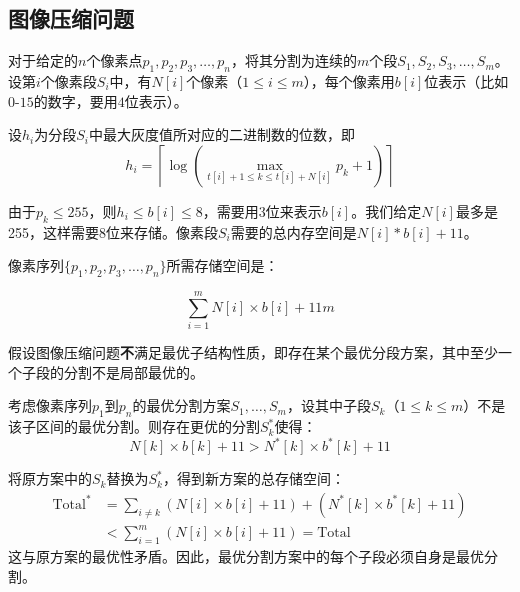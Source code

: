 \documentclass[./../main.tex]{subfiles}
\begin{document}
\subsection{图像压缩问题}

对于给定的$n$个像素点$p_1, p_2, p_3, \ldots, p_n$，将其分割为连续的$m$个段$S_1, S_2, S_3, \ldots, S_m$。设第$i$个像素段$S_i$中，有$N[i]$个像素（$1 \leq i \leq m$），每个像素用$b[i]$位表示（比如$0$-$15$的数字，要用$4$位表示）。

设$h_i$为分段$S_i$中最大灰度值所对应的二进制数的位数，即
$$
h_{i} = \left\lceil \log \left( \max_{t[i]+1 \leq k \leq t[i]+N[i]} p_{k} + 1 \right) \right\rceil
$$

由于$p_k \leq 255$，则$h_i \leq b[i] \leq 8$，需要用$3$位来表示$b[i]$。我们给定$N[i]$最多是255，这样需要8位来存储。像素段$S_i$需要的总内存空间是$N[i] * b[i] + 11$。

像素序列$\{p_1, p_2, p_3, \ldots, p_n\}$所需存储空间是：

$$
\sum_{i=1}^{m} N[i] \times b[i] + 11m
$$

假设图像压缩问题\textbf{不}满足最优子结构性质，即存在某个最优分段方案，其中至少一个子段的分割不是局部最优的。

考虑像素序列$p_1$到$p_n$的最优分割方案$S_1,\ldots,S_m$，设其中子段$S_k$（$1 \leq k \leq m$）不是该子区间的最优分割。则存在更优的分割$S_k^*$使得：
\begin{equation*}
N[k] \times b[k] + 11 > N^*[k] \times b^*[k] + 11
\end{equation*}

将原方案中的$S_k$替换为$S_k^*$，得到新方案的总存储空间：
\begin{align*}
\text{Total}^* &= \sum_{i\neq k} (N[i] \times b[i] + 11) + (N^*[k] \times b^*[k] + 11) \\
&< \sum_{i=1}^{m} (N[i] \times b[i] + 11) = \text{Total}
\end{align*}
这与原方案的最优性矛盾。因此，最优分割方案中的每个子段必须自身是最优分割。
\end{document}
